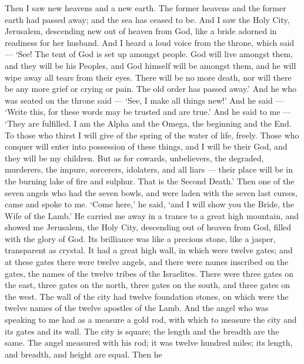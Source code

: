  Then I saw new heavens and a new earth. The former heavens
and the former earth had passed away; and the sea has ceased to be.
 And I saw the Holy City, Jerusalem, descending new out of
heaven from God, like a bride adorned in readiness for her husband.
 And I heard a loud voice from the throne, which said ---
`See! The tent of God is set up amongst people. God will live amongst
them, and they will be his Peoples, and God himself will be amongst
them,  and he will wipe away all tears from their eyes.
There will be no more death, nor will there be any more grief or crying
or pain. The old order has passed away.'  And he who was
seated on the throne said --- `See, I make all things new!' And he said
--- `Write this, for these words may be trusted and are true.'
 And he said to me --- `They are fulfilled. I am the Alpha
and the Omega, the beginning and the End. To those who thirst I will
give of the spring of the water of life, freely.  Those who
conquer will enter into possession of these things, and I will be their
God, and they will be my children.  But as for cowards,
unbelievers, the degraded, murderers, the impure, sorcerers, idolaters,
and all liars --- their place will be in the burning lake of fire and
sulphur. That is the Second Death.'  Then one of the seven
angels who had the seven bowls, and were laden with the seven last
curses, came and spoke to me. `Come here,' he said, `and I will show you
the Bride, the Wife of the Lamb.'  He carried me away in a
trance to a great high mountain, and showed me Jerusalem, the Holy City,
descending out of heaven from God, filled with the glory of God.
 Its brilliance was like a precious stone, like a jasper,
transparent as crystal.  It had a great high wall, in which
were twelve gates; and at these gates there were twelve angels, and
there were names inscribed on the gates, the names of the twelve tribes
of the Israelites.  There were three gates on the east,
three gates on the north, three gates on the south, and three gates on
the west.  The wall of the city had twelve foundation
stones, on which were the twelve names of the twelve apostles of the
Lamb.  And the angel who was speaking to me had as a
measure a gold rod, with which to measure the city and its gates and its
wall.  The city is square; the length and the breadth are
the same. The angel measured with his rod; it was twelve hundred miles;
its length, and breadth, and height are equal.  Then he
